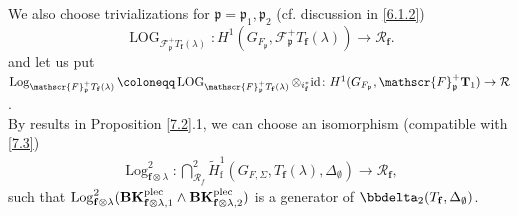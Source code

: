 \documentclass[10pt]{amsart}
\numberwithin{equation}{section}
\theoremstyle{definition}
\theoremstyle{remark} %
\newcommand{\Log}{\operatorname{Log}}
\DeclareMathOperator{\LOG}{LOG}
\newcommand{\f}{\mathbf{f}}
\newcommand{\scrF}{\mathscr{F}}
\newcommand{\p}{\mathfrak{p}}
\newcommand{\R}{\mathcal{R}}
\newcommand{\T}{\mathbf{T}}
\begin{document}
		We also choose trivializations for $\p = \p_1, \p_2$ (cf. discussion in \textsection \ref{6.1.2})
		\begin{equation}
			\label{7.3}
			\LOG_{\scrF^+_{\p} T_\f(\lambda)} \colon H^1(G_{F_{\p}}, \scrF^+_{\p} T_\f(\lambda)) \rightarrow \R_\f.
		\end{equation}
		and let us put $ \Log_{\scrF^+_{\p} T_\f(\lambda)} \coloneqq \LOG_{\scrF^+_{\p} T_\f(\lambda)} \otimes_{i_\f^*} {\rm id} 
		\colon H^1(G_{F_{\p}}, \scrF^+_{\p} \T_1) \rightarrow \R $.\\
		By results in Proposition \ref{7.2}.1, we can choose an isomorphism (compatible with \eqref{7.3})
		\begin{align}
			\Log^2_{\f \otimes \lambda} \colon \bigcap^2_{\R_f}\widetilde{H}^1_{\mathrm{f}}(G_{F,\Sigma},T_\f(\lambda),\Delta_\emptyset) \rightarrow \R_{\f},
		\end{align} 
		such that $ \Log^2_{\f \otimes \lambda}(\mathbf{BK}^{\rm plec}_{\f \otimes \lambda, 1} \wedge \mathbf{BK}^{\rm plec}_{\f \otimes \lambda, 2} ) $ is a generator of $ \bbdelta_2(T_\f, \Delta_\emptyset) $.
		
\end{document}
